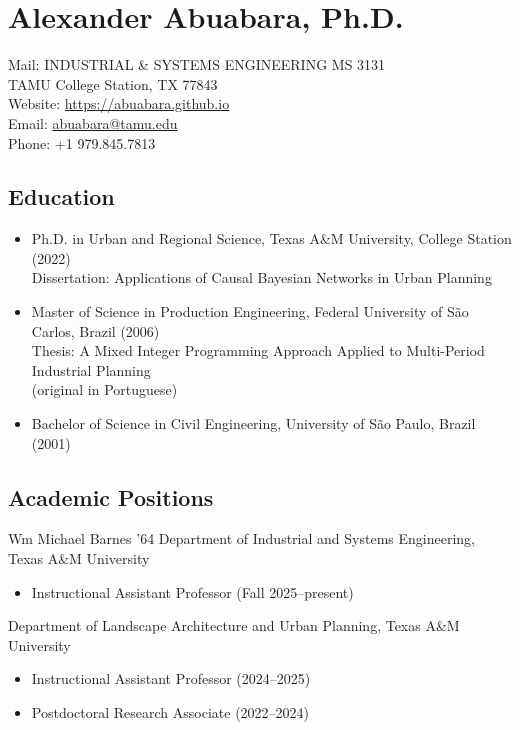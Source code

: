 \documentclass[11pt,oneside]{article}
\begin{document}
\pagestyle{firstpage}
\raggedright

\section*{Alexander Abuabara, Ph.D.}
Mail: INDUSTRIAL \& SYSTEMS ENGINEERING MS 3131\\
\hspace{0.9cm} TAMU College Station, TX 77843\\[1pt]
Website: \url{https://abuabara.github.io}\\[1pt]
Email: \href{abuabara@tamu.edu}{abuabara@tamu.edu}\\[1pt]
Phone: +1 979.845.7813

\subsection*{Education}
\begin{itemize}[leftmargin=20pt]
\item Ph.D. in Urban and Regional Science, Texas A\&M University, College Station (2022)\\[1pt]
      Dissertation: Applications of Causal Bayesian Networks in Urban Planning
\item Master of Science in Production Engineering, Federal University of São Carlos, Brazil (2006)\\[1pt]
      Thesis: A Mixed Integer Programming Approach Applied to Multi-Period Industrial Planning\\
      {\small (original in Portuguese)}
\item Bachelor of Science in Civil Engineering, University of São Paulo, Brazil (2001)
\end{itemize}

\subsection*{Academic Positions}
{Wm Michael Barnes ’64 Department of Industrial and Systems Engineering, Texas A\&M University}
\begin{itemize}[leftmargin=20pt]
\item Instructional Assistant Professor (Fall 2025--present)
\end{itemize}

\vspace{3pt}

{Department of Landscape Architecture and Urban Planning, Texas A\&M University}
\begin{itemize}[leftmargin=20pt]
\item Instructional Assistant Professor (2024--2025)
\item Postdoctoral Research Associate (2022--2024)
\end{itemize}
\end{document}
